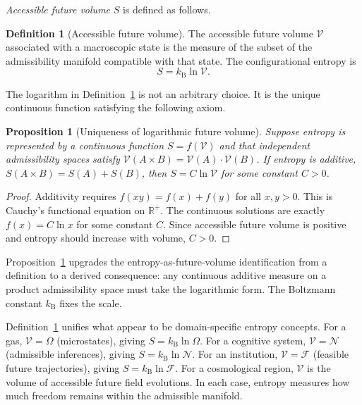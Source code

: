 \documentclass[12pt, oneside]{book}
\theoremstyle{plain}
\newtheorem{proposition}[theorem]{Proposition}
\theoremstyle{definition}
\newtheorem{definition}[theorem]{Definition}
\newcommand{\kB}{k_{\mathrm{B}}}
\newcommand{\Vac}{\mathcal{V}}
\begin{document}
\textit{Accessible future volume} $S$ is defined as follows.

\begin{definition}[Accessible future volume]
\label{def:s}
The accessible future volume $\Vac$ associated with a macroscopic state is the
measure of the subset of the admissibility manifold compatible with that state.
The configurational entropy is
\begin{equation}
  S = \kB \ln \Vac.
  \label{eq:entropy}
\end{equation}
\end{definition}

The logarithm in Definition~\ref{def:s} is not an arbitrary choice. It is the
unique continuous function satisfying the following axiom.

\begin{proposition}[Uniqueness of logarithmic future volume]
\label{prop:log-unique}
Suppose entropy is represented by a continuous function $S = f(\Vac)$ and that
independent admissibility spaces satisfy $\Vac(A\times B) = \Vac(A)\cdot\Vac(B)$.
If entropy is additive, $S(A \times B) = S(A) + S(B)$, then $S = C\ln\Vac$ for
some constant $C > 0$.
\end{proposition}

\begin{proof}
Additivity requires $f(xy) = f(x) + f(y)$ for all $x, y > 0$. This is Cauchy's
functional equation on $\mathbb{R}^+$. The continuous solutions are exactly
$f(x) = C\ln x$ for some constant $C$. Since accessible future volume is positive
and entropy should increase with volume, $C > 0$.
\end{proof}

Proposition~\ref{prop:log-unique} upgrades the entropy-as-future-volume identification
from a definition to a derived consequence: any continuous additive measure on a
product admissibility space must take the logarithmic form. The Boltzmann constant
$\kB$ fixes the scale.

Definition~\ref{def:s} unifies what appear to be domain-specific entropy concepts.
For a gas, $\Vac = \Omega$ (microstates), giving $S = \kB\ln\Omega$. For a cognitive
system, $\Vac = \mathcal{N}$ (admissible inferences), giving $S = \kB\ln\mathcal{N}$.
For an institution, $\Vac = \mathcal{F}$ (feasible future trajectories), giving
$S = \kB\ln\mathcal{F}$. For a cosmological region, $\Vac$ is the volume of accessible
future field evolutions. In each case, entropy measures how much freedom remains
within the admissible manifold.
\end{document}
